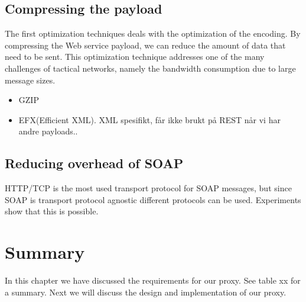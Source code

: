 \subsection{Compressing the payload}

The first optimization techniques deals with the optimization of the encoding.
By compressing the Web service payload, we can reduce the amount of data that
need to be sent. This optimization technique addresses one of the many
challenges of tactical networks, namely the bandwidth consumption due to large
message sizes.

\begin{itemize}
\item GZIP

\item EFX(Efficient XML). XML spesifikt, får ikke brukt på REST når vi har andre
payloads..

\end{itemize}

\subsection{Reducing overhead of SOAP}
HTTP/TCP is the most used transport protocol for SOAP messages, but since SOAP is transport protocol agnostic different protocols can be used. Experiments show that this is possible.


\section{Summary}

In this chapter we have discussed the requirements for our proxy. See table xx for a summary. Next we will discuss the design and implementation of our proxy.
